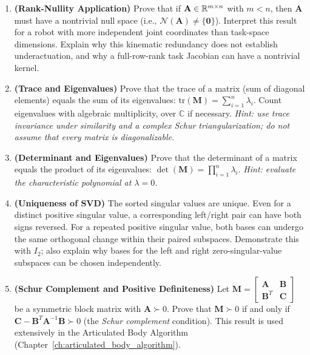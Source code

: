 \begin{enumerate}[resume]
    \item \textbf{(Rank-Nullity Application)} Prove that if $\mathbf{A} \in \mathbb{R}^{m \times n}$ with $m < n$, then $\mathbf{A}$ must have a nontrivial null space (i.e., $\mathcal{N}(\mathbf{A}) \neq \{\mathbf{0}\}$). Interpret this result for a robot with more independent joint coordinates than task-space dimensions. Explain why this kinematic redundancy does not establish underactuation, and why a full-row-rank task Jacobian can have a nontrivial kernel.

    \item \textbf{(Trace and Eigenvalues)} Prove that the trace of a matrix (sum of diagonal elements) equals the sum of its eigenvalues: $\text{tr}(\mathbf{M}) = \sum_{i=1}^n \lambda_i$. Count eigenvalues with algebraic multiplicity, over $\mathbb C$ if necessary. \emph{Hint: use trace invariance under similarity and a complex Schur triangularization; do not assume that every matrix is diagonalizable.}

    \item \textbf{(Determinant and Eigenvalues)} Prove that the determinant of a matrix equals the product of its eigenvalues: $\det(\mathbf{M}) = \prod_{i=1}^n \lambda_i$. \emph{Hint: evaluate the characteristic polynomial at $\lambda = 0$.}

    \item \textbf{(Uniqueness of SVD)} The sorted singular values are unique. Even for a distinct positive singular value, a corresponding left/right pair can have both signs reversed. For a repeated positive singular value, both bases can undergo the same orthogonal change within their paired subspaces. Demonstrate this with $I_2$; also explain why bases for the left and right zero-singular-value subspaces can be chosen independently.

    \item \textbf{(Schur Complement and Positive Definiteness)} Let $\mathbf{M} = \begin{bmatrix} \mathbf{A} & \mathbf{B} \\ \mathbf{B}^T & \mathbf{C} \end{bmatrix}$ be a symmetric block matrix with $\mathbf{A} \succ 0$. Prove that $\mathbf{M} \succ 0$ if and only if $\mathbf{C} - \mathbf{B}^T \mathbf{A}^{-1} \mathbf{B} \succ 0$ (the \emph{Schur complement} condition). This result is used extensively in the Articulated Body Algorithm (Chapter~\ref{ch:articulated_body_algorithm}).
\end{enumerate}
